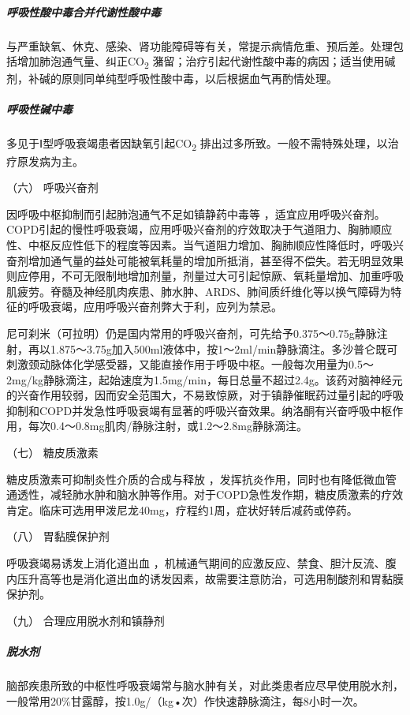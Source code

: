 \subparagraph{呼吸性酸中毒合并代谢性酸中毒}

与严重缺氧、休克、感染、肾功能障碍等有关，常提示病情危重、预后差。处理包括增加肺泡通气量、纠正CO\textsubscript{2}
潴留；治疗引起代谢性酸中毒的病因；适当使用碱剂，补碱的原则同单纯型呼吸性酸中毒，以后根据血气再酌情处理。

\subparagraph{呼吸性碱中毒}

多见于Ⅰ型呼吸衰竭患者因缺氧引起CO\textsubscript{2}
排出过多所致。一般不需特殊处理，以治疗原发病为主。

\hypertarget{text00076.htmlux5cux23CHP3-4-3-2-6}{}
（六） 呼吸兴奋剂

因呼吸中枢抑制而引起肺泡通气不足如镇静药中毒等
，适宜应用呼吸兴奋剂。COPD引起的慢性呼吸衰竭，应用呼吸兴奋剂的疗效取决于气道阻力、胸肺顺应性、中枢反应性低下的程度等因素。当气道阻力增加、胸肺顺应性降低时，呼吸兴奋剂增加通气量的益处可能被氧耗量的增加所抵消，甚至得不偿失。若无明显效果则应停用，不可无限制地增加剂量，剂量过大可引起惊厥、氧耗量增加、加重呼吸肌疲劳。脊髓及神经肌肉疾患、肺水肿、ARDS、肺间质纤维化等以换气障碍为特征的呼吸衰竭，应用呼吸兴奋剂弊大于利，应列为禁忌。

尼可刹米（可拉明）仍是国内常用的呼吸兴奋剂，可先给予0.375～0.75g静脉注射，再以1.875～3.75g加入500ml液体中，按1～2ml/min静脉滴注。多沙普仑既可刺激颈动脉体化学感受器，又能直接作用于呼吸中枢。一般每次用量为0.5～2mg/kg静脉滴注，起始速度为1.5mg/min，每日总量不超过2.4g。该药对脑神经元的兴奋作用较弱，因而安全范围大，不易致惊厥，对于镇静催眠药过量引起的呼吸抑制和COPD并发急性呼吸衰竭有显著的呼吸兴奋效果。纳洛酮有兴奋呼吸中枢作用，每次0.4～0.8mg肌肉/静脉注射，或1.2～2.8mg静脉滴注。

\hypertarget{text00076.htmlux5cux23CHP3-4-3-2-7}{}
（七） 糖皮质激素

糖皮质激素可抑制炎性介质的合成与释放
，发挥抗炎作用，同时也有降低微血管通透性，减轻肺水肿和脑水肿等作用。对于COPD急性发作期，糖皮质激素的疗效肯定。临床可选用甲泼尼龙40mg，疗程约1周，症状好转后减药或停药。

\hypertarget{text00076.htmlux5cux23CHP3-4-3-2-8}{}
（八） 胃黏膜保护剂

呼吸衰竭易诱发上消化道出血
，机械通气期间的应激反应、禁食、胆汁反流、腹内压升高等也是消化道出血的诱发因素，故需要注意防治，可选用制酸剂和胃黏膜保护剂。

\hypertarget{text00076.htmlux5cux23CHP3-4-3-2-9}{}
（九） 合理应用脱水剂和镇静剂

\subparagraph{脱水剂}

脑部疾患所致的中枢性呼吸衰竭常与脑水肿有关，对此类患者应尽早使用脱水剂，一般常用20\%甘露醇，按1.0g/（kg•次）作快速静脉滴注，每8小时一次。

